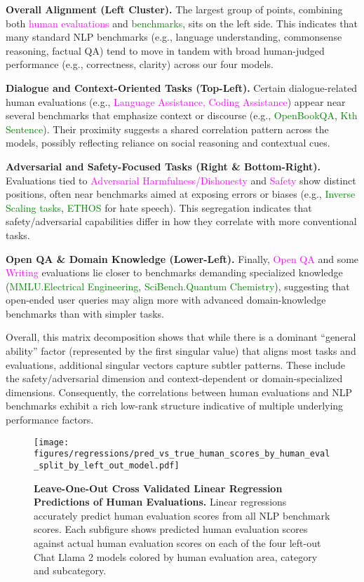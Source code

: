 \textbf{Overall Alignment (Left Cluster).} The largest group of points, combining both \textcolor{Magenta}{human evaluations} and \textcolor{Green}{benchmarks}, sits on the left side. This indicates that many standard NLP benchmarks (e.g., language understanding, commonsense reasoning, factual QA) tend to move in tandem with broad human-judged performance (e.g., correctness, clarity) across our four models.

\textbf{Dialogue and Context-Oriented Tasks (Top-Left).} Certain dialogue-related human evaluations (e.g., \textcolor{Magenta}{Language Assistance, Coding Assistance}) appear near several benchmarks that emphasize context or discourse (e.g., \textcolor{Green}{OpenBookQA}, \textcolor{Green}{Kth Sentence}). Their proximity suggests a shared correlation pattern across the models, possibly reflecting reliance on social reasoning and contextual cues.

\textbf{Adversarial and Safety-Focused Tasks (Right \& Bottom-Right).} Evaluations tied to \textcolor{Magenta}{Adversarial Harmfulness/Dishonesty} and \textcolor{Magenta}{Safety} show distinct positions, often near benchmarks aimed at exposing errors or biases (e.g., \textcolor{Green}{Inverse Scaling tasks}, \textcolor{Green}{ETHOS} for hate speech). This segregation indicates that safety/adversarial capabilities differ in how they correlate with more conventional tasks.

\textbf{Open QA \& Domain Knowledge (Lower-Left).} Finally, \textcolor{Magenta}{Open QA} and some \textcolor{Magenta}{Writing} evaluations lie closer to benchmarks demanding specialized knowledge (\textcolor{Green}{MMLU.Electrical Engineering}, \textcolor{Green}{SciBench.Quantum Chemistry}), suggesting that open-ended user queries may align more with advanced domain-knowledge benchmarks than with simpler tasks.

Overall, this matrix decomposition shows that while there is a dominant “general ability” factor (represented by the first singular value) that aligns most tasks and evaluations, additional singular vectors capture subtler patterns. These include the safety/adversarial dimension and context-dependent or domain-specialized dimensions. Consequently, the correlations between human evaluations and NLP benchmarks exhibit a rich low-rank structure indicative of multiple underlying performance factors.

\begin{figure*}[t!]
    \centering
    \texttt{[image: figures/regressions/pred\_vs\_true\_human\_scores\_by\_human\_eval\_split\_by\_left\_out\_model.pdf]}
    \caption{\textbf{Leave-One-Out Cross Validated Linear Regression Predictions of Human Evaluations.} Linear regressions accurately predict human evaluation scores from all NLP benchmark scores. Each subfigure shows predicted human evaluation scores against actual human evaluation scores on each of the four left-out Chat Llama 2 models colored by human evaluation area, category and subcategory.}
    \label{fig:reg:overparameterized_regressions_leave_one_out}
\end{figure*}